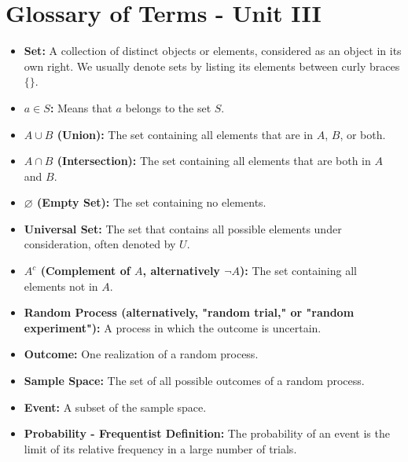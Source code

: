\documentclass{article}
\let\emptyset\varnothing
\begin{document}
\newpage

\section*{Glossary of Terms - Unit III}

\begin{itemize}
    \item \textbf{Set:} A collection of distinct objects or elements, considered as an object in its own right. We usually denote sets by listing its elements between curly braces $\{\}$.

    \item \textbf{\( a \in S \):} Means that \( a \) belongs to the set \( S \).

    \item \textbf{\( A \cup B \) (Union):} The set containing all elements that are in \( A \), \( B \), or both.

    \item \textbf{\( A \cap B \) (Intersection):} The set containing all elements that are both in \( A \) and \( B \).

    \item \textbf{\( \emptyset \) (Empty Set):} The set containing no elements.

    \item \textbf{Universal Set:} The set that contains all possible elements under consideration, often denoted by \( U \).

    \item \textbf{\( A^c \) (Complement of \( A \), alternatively \( \neg A \)):} The set containing all elements not in \( A \).

    \item \textbf{Random Process (alternatively, "random trial," or "random experiment"):} A process in which the outcome is uncertain.

    \item \textbf{Outcome:} One realization of a random process.

    \item \textbf{Sample Space:} The set of all possible outcomes of a random process.

    \item \textbf{Event:} A subset of the sample space.

    \item \textbf{Probability - Frequentist Definition:} The probability of an event is the limit of its relative frequency in a large number of trials.


\end{itemize}
\end{document}
